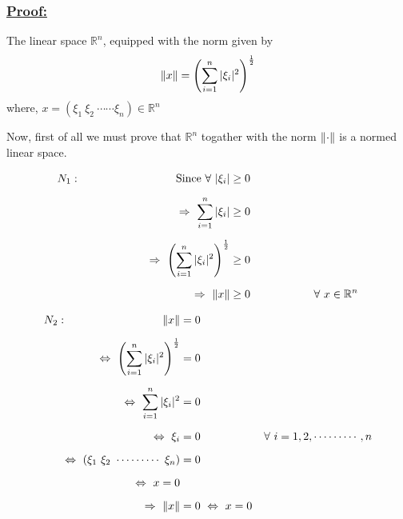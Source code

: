 \documentclass[a4paper,12pt]{article}
\begin{document}
    \vspace*{0.5cm}

    \subsubsection*{\underline{{\bf Proof:}}}

    The linear space $\mathbb{R}^n$, equipped with the norm given by 
    \[\norm{x} = \left(\sum_{i=1}^{n}|\xi_i|^2\right)^{\frac{1}{2}}\] where, $x = \left(\xi_1\ \xi_2\ \cdots \cdots\xi_n\right)\in \mathbb{R}^n$

    Now, first of all we must prove that $\mathbb{R}^n$ togather with the norm $\norm{\cdot}$ is a normed linear space.

    \begin{equation*}
        \begin{split}
            N_1:\hspace*{3cm} \mbox{Since}\ \forall\ |\xi_i|  &\geq 0\\[2mm]
            \Rightarrow\ \sum_{i=1}^{n} |\xi_i| & \geq 0\\[2mm]
            \Rightarrow\ \left(\sum_{i=1}^{n} |\xi_i|^2 \right)^{\frac{1}{2}} & \geq 0\\[2mm]
            \Rightarrow\ \norm{x} & \geq 0 \hspace*{2cm} \forall\ x\in \mathbb{R}^n
        \end{split}
    \end{equation*}

    \begin{equation*}
        \begin{split}
            N_2:\hspace*{3cm} \norm{x} & = 0\\[2mm]
            \Leftrightarrow\ \left(\sum_{i=1}^{n} |\xi_i|^2 \right)^{\frac{1}{2}} & = 0\\[2mm]
            \Leftrightarrow\ \sum_{i=1}^{n} |\xi_i|^2  & = 0\\[2mm]
            \Leftrightarrow\ \xi_i & = 0 \hspace*{2cm} \forall\ i = 1,2,\cdots \cdots \cdots,n\\[2mm]
            \Leftrightarrow\ \left(\xi_1\ \xi_2\ \cdots \cdots \cdots\ \xi_n\right) & = 0\\[2mm]
            \Leftrightarrow\ x = 0\\[2mm]
            \Rightarrow\ \norm{x} & = 0\ \Leftrightarrow\ x = 0 
        \end{split}
    \end{equation*}
\end{document}

